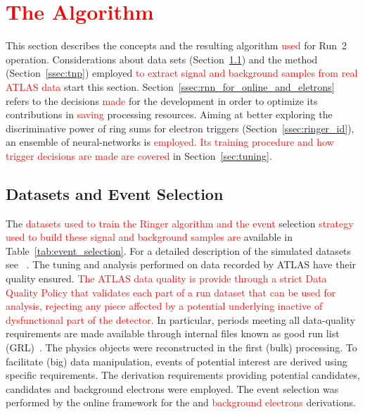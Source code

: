 \chapter{\textcolor{red}{The \rnn{} Algorithm}}%
\label{sec:neuralringer}

This section describes the \rnn{} concepts and the resulting algorithm \textcolor{red}{used} for Run~2
operation. Considerations about data sets (Section~\ref{ssec:dataset}) and the \TnP method
(Section~\ref{ssec:tnp}) employed \textcolor{red}{to extract signal and background samples
from real ATLAS data} start this section. Section~\ref{ssec:rnn_for_online_and_eletrons} refers to the
decisions \textcolor{red}{made} for the \rnn{} development in order to optimize its contributions in \textcolor{red}{saving} processing resources. Aiming at better exploring the discriminative
power of ring sums for electron triggers (Section~\ref{ssec:ringer_id}),
an ensemble of neural-networks is \textcolor{red}{employed. Its training procedure and how trigger decisions are made are covered} in Section~\ref{sec:tuning}.




\section{Datasets and Event Selection}%
\label{ssec:dataset}

The \textcolor{red}{datasets used to train the Ringer algorithm and the event} selection \textcolor{red}{strategy used to build these signal and background samples are} available in
Table~\ref{tab:event_selection}. For a detailed description of the simulated
datasets see ~\cite[Section 3]{ATLAS-PERF-2017-01-002}. The tuning and analysis
performed on data recorded by ATLAS have their quality ensured. \textcolor{red}{The ATLAS data quality is provide through a strict Data Quality Policy that validates each part of a run dataset that can be used for analysis, rejecting any piece affected by a potential underlying inactive of dysfunctional part of the detector.} 
In particular, periods meeting all data-quality requirements
are made available through internal files known as good run list
(GRL)~\cite{grl_site}. The physics objects were reconstructed in the first
(bulk) processing. To facilitate (big) data manipulation, events of potential
interest are derived using specific requirements. The derivation requirements
providing potential \Zee{} \tnp{} candidates, %
\Jee{} \tnp{} candidates
 and background electrons %
  were employed. The event selection was
performed by the online framework for the \textcolor{red}{\Zee{} \tnp{}} and \textcolor{red}{background electrons} derivations.%

